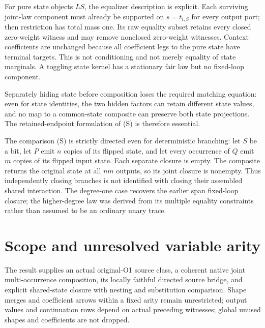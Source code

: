 \documentclass[11pt]{article}
\begin{document}
For pure state objects $LS$, the equalizer description is explicit. Each surviving joint-law component must already be supported on $s=t_{i,S}$ for every output port; then restriction has total mass one. Its raw equality subset retains every closed zero-weight witness and may remove nonclosed zero-weight witnesses. Context coefficients are unchanged because all coefficient legs to the pure state have terminal targets. This is not conditioning and not merely equality of state marginals. A toggling state kernel has a stationary fair law but no fixed-loop component.

Separately hiding state before composition loses the required matching equation: even for state identities, the two hidden factors can retain different state values, and no map to a common-state composite can preserve both state projections. The retained-endpoint formulation of (S) is therefore essential.

The comparison (S) is strictly directed even for deterministic branching: let $S$ be a bit, let $P$ emit $n$ copies of its flipped state, and let every occurrence of $Q$ emit $m$ copies of its flipped input state. Each separate closure is empty. The composite returns the original state at all $nm$ outputs, so its joint closure is nonempty. Thus independently closing branches is not identified with closing their assembled shared interaction. The degree-one case recovers the earlier span fixed-loop closure; the higher-degree law was derived from its multiple equality constraints rather than assumed to be an ordinary unary trace.

\section{Scope and unresolved variable arity}
The result supplies an actual original-O1 source class, a coherent native joint multi-occurrence composition, its locally faithful directed source bridge, and explicit shared-state closure with nesting and substitution comparison. Shape merges and coefficient arrows within a fixed arity remain unrestricted; output values and continuation rows depend on actual preceding witnesses; global unused shapes and coefficients are not dropped.
\end{document}
